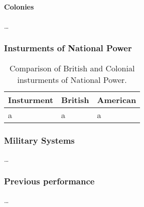 \paragraph{Colonies}

\ldots

\subsubsection{Insturments of National Power}

\begin{table}
  \begin{center}
  \begin{tabular}{lll}\toprule
    Insturment & British & American \\\midrule
	a & a & a \\\bottomrule
  \end{tabular}
  \end{center}
  \caption{Comparison of British and Colonial insturments of National Power.}
\end{table}

\subsubsection{Military Systems}

\ldots

\subsubsection{Previous performance}

\ldots
